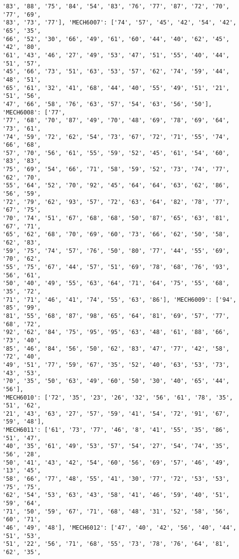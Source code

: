 \documentclass[11pt]{article}
\begin{document}
\begin{Verbatim}[commandchars=\\\{\}]
'83', '88', '75', '84', '54', '83', '76', '77', '87', '72', '70', '77', '69',
'83', '73', '77'], 'MECH6007': ['74', '57', '45', '42', '54', '42', '65', '35',
'66', '52', '30', '66', '49', '61', '60', '44', '40', '62', '45', '42', '80',
'61', '43', '46', '27', '49', '53', '47', '51', '55', '40', '44', '51', '57',
'45', '66', '73', '51', '63', '53', '57', '62', '74', '59', '44', '48', '51',
'65', '61', '32', '41', '68', '44', '40', '55', '49', '51', '21', '51', '56',
'47', '66', '58', '76', '63', '57', '54', '63', '56', '50'], 'MECH6008': ['77',
'77', '68', '70', '87', '49', '70', '48', '69', '78', '69', '64', '73', '61',
'74', '59', '72', '62', '54', '73', '67', '72', '71', '55', '74', '66', '68',
'57', '70', '56', '61', '55', '59', '52', '45', '61', '54', '60', '83', '83',
'75', '69', '54', '66', '71', '58', '59', '52', '73', '74', '77', '62', '70',
'55', '64', '52', '70', '92', '45', '64', '64', '63', '62', '86', '56', '59',
'72', '79', '62', '93', '57', '72', '63', '64', '82', '78', '77', '67', '75',
'70', '74', '51', '67', '68', '68', '50', '87', '65', '63', '81', '67', '71',
'65', '62', '68', '70', '69', '60', '73', '66', '62', '50', '58', '62', '83',
'59', '75', '74', '57', '76', '50', '80', '77', '44', '55', '69', '70', '62',
'55', '75', '67', '44', '57', '51', '69', '78', '68', '76', '93', '56', '61',
'50', '40', '49', '55', '63', '64', '71', '64', '75', '55', '68', '35', '72',
'71', '71', '46', '41', '74', '55', '63', '86'], 'MECH6009': ['94', '85', '99',
'81', '55', '68', '87', '98', '65', '64', '81', '69', '57', '77', '68', '72',
'92', '62', '84', '75', '95', '95', '63', '48', '61', '88', '66', '73', '40',
'85', '46', '84', '56', '50', '62', '83', '47', '77', '42', '58', '72', '40',
'49', '51', '77', '59', '67', '35', '52', '40', '63', '53', '73', '43', '53',
'70', '35', '50', '63', '49', '60', '50', '30', '40', '65', '44', '56'],
'MECH6010': ['72', '35', '23', '26', '32', '56', '61', '78', '35', '51', '62',
'21', '43', '63', '27', '57', '59', '41', '54', '72', '91', '67', '59', '48'],
'MECH6011': ['61', '73', '77', '46', '8', '41', '55', '35', '86', '51', '47',
'40', '35', '61', '49', '53', '57', '54', '27', '54', '74', '35', '56', '28',
'50', '41', '43', '42', '54', '60', '56', '69', '57', '46', '49', '13', '45',
'58', '66', '77', '48', '55', '41', '30', '77', '72', '53', '53', '75', '75',
'62', '54', '53', '63', '43', '58', '41', '46', '59', '40', '51', '59', '64',
'71', '50', '59', '67', '71', '68', '48', '31', '52', '58', '56', '60', '71',
'46', '49', '48'], 'MECH6012': ['47', '40', '42', '56', '40', '44', '51', '53',
'51', '22', '56', '71', '68', '55', '73', '78', '76', '64', '81', '62', '35',

\end{Verbatim}
\end{document}
